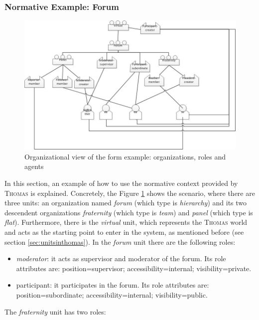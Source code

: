 \begin{enumerate}
\subsubsection{Normative Example: Forum}


\begin{figure}[hbtp]
\includegraphics[width=1\textwidth]{Thomas/images/ejemploNormas.jpg}
\caption{Organizational view of the form example: organizations, roles and agents}
\label{fig:normExample}
\end{figure}

In this section,  an example of how to use the normative context provided by \textsc{Thomas} is explained. Concretely,  the Figure \ref{fig:normExample} shows the scenario, where there are three units:  an organization named \textit{forum} (which type is \textit{hierarchy}) and its two descendent organizations \textit{fraternity} (which type is \textit{team}) and \textit{panel} (which type is \textit{flat}). Furthermore, there is the \textit{virtual} unit, which represents the \textsc{Thomas} world  and acts as the starting point to enter in the system, as mentioned before (see section \ref{sec:unitsinthomas}). In the \textit{forum} unit there are the following roles:
\begin{itemize}
\item \textit{moderator}: it acts as supervisor and moderator of the forum. Its role attributes are: position=supervisor; accessibility=internal; visibility=private.
\item participant: it participates in the forum.  Its role attributes are: position=subordinate; accessibility=internal; visibility=public.
\end{itemize}

The \textit{fraternity} unit has two roles:


\end{enumerate}
